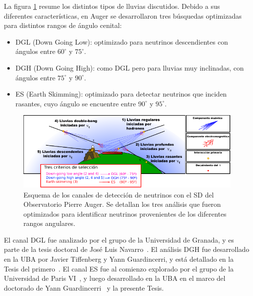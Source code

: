 La figura \ref{fig:augerNu} resume los distintos tipos de lluvias discutidos.
Debido a sus diferentes características, en Auger se desarrollaron tres búsquedas optimizadas para distintos rangos de ángulo cenital:
\begin{itemize}
   \item DGL (Down Going Low): optimizado para neutrinos descendientes con ángulos entre $60^\circ$ y $75^\circ$.
   \item DGH (Down Going High): como DGL pero para lluvias muy inclinadas, con ángulos entre $75^\circ$ y $90^\circ$. 
   \item ES (Earth Skimming): optimizado para detectar neutrinos que inciden rasantes, cuyo ángulo se encuentre entre $90^\circ$ y $95^\circ$.
\end{itemize}
	\begin{figure}[ht!]
		\centering
		\includegraphics[width=\textwidth]{./fig/estrategiaAuger/auger_nu}
		\caption{\label{fig:augerNu}
		Esquema de los canales de detección de neutrinos con el SD del Observatorio Pierre Auger. Se detallan los tres análisis que fueron optimizados para identificar neutrinos provenientes de los diferentes rangos angulares.
		}
	\end{figure}
%

	El canal DGL fue analizado por el grupo de la Universidad de Granada, y es parte de la tesis doctoral de Jos\'e Luis Navarro~\cite{cite:tesisNavarro}. El análisis DGH fue desarrollado en la UBA por Javier Tiffenberg y Yann Guardincerri, y está detallado en la Tesis del primero~\cite{cite:tesisJavier}. El canal ES fue al comienzo explorado por el grupo de la Universidad de Paris VI~\cite{cite:propagaTierra}, y luego desarrollado en la UBA en el marco del doctorado de Yann Guardincerri~\cite{cite:tesisYann} y la presente Tesis. 

